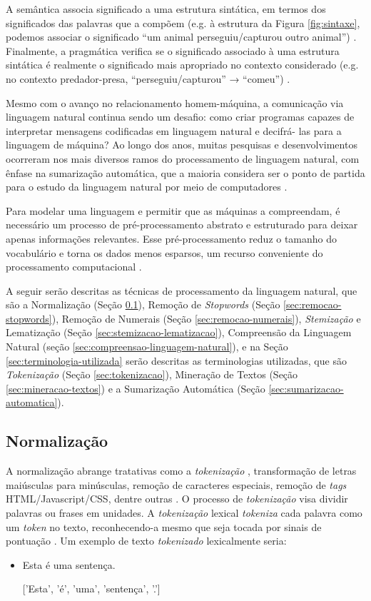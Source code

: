 A semântica associa significado a uma estrutura sintática, em termos dos significados das palavras que a compõem (e.g. à estrutura da Figura \ref{fig:sintaxe}, podemos associar o significado “um animal 
perseguiu/capturou outro animal”) \cite{de2019unidades}. Finalmente, a pragmática verifica se o significado 
associado à uma estrutura sintática é realmente o significado mais apropriado no contexto considerado (e.g. 
no contexto predador-presa, “perseguiu/capturou” → “comeu”) \cite{moro2018reconhecimento}.

Mesmo com o avanço no relacionamento homem-máquina, a comunicação via linguagem natural continua sendo um 
desafio: como criar programas capazes de interpretar mensagens codificadas em linguagem natural e decifrá-
las para a linguagem de máquina? \cite{silva2021detecccao} Ao longo dos anos, muitas pesquisas e 
desenvolvimentos ocorreram nos mais diversos ramos do processamento de linguagem natural, com ênfase na 
sumarização automática, que a maioria considera ser o ponto de partida para o estudo da linguagem natural 
por meio de computadores \cite{rodriguez2020processamento}.

Para modelar uma linguagem e permitir que as máquinas a compreendam, é necessário um processo de pré-processamento abstrato e estruturado para deixar apenas informações relevantes. Esse pré-processamento reduz o tamanho do vocabulário e torna os dados menos esparsos, um recurso conveniente do processamento computacional \cite{de2020mike}.

A seguir serão descritas as técnicas de processamento da linguagem natural, que são a Normalização (Seção \ref{sec:normalizacao}), Remoção de \textit{Stopwords} (Seção \ref{sec:remocao-stopwords}), Remoção de Numerais (Seção \ref{sec:remocao-numerais}), \textit{Stemização} e Lematização (Seção \ref{sec:stemizacao-lematizacao}), Compreensão da Linguagem Natural (seção \ref{sec:compreensao-linguagem-natural}), e na Seção \ref{sec:terminologia-utilizada} serão descritas as terminologias utilizadas, que são \textit{Tokenização} (Seção \ref{sec:tokenizacao}), Mineração de Textos (Seção \ref{sec:mineracao-textos}) e a Sumarização Automática (Seção \ref{sec:sumarizacao-automatica}).

\subsection{Normalização}
\label{sec:normalizacao}
A normalização abrange tratativas como a \textit{tokenização} \cite{de2022processamento}, transformação de letras 
maiúsculas para minúsculas, remoção de caracteres especiais, remoção de \textit{tags} HTML/Javascript/CSS, 
dentre outras \cite{motta2018estudo}. O processo de \textit{tokenização} visa dividir palavras ou frases em unidades. A \textit{tokenização} lexical \textit{tokeniza} cada palavra como um \textit{token} no texto, reconhecendo-a mesmo que seja tocada por sinais de pontuação \cite{cidrimtecnologias}. 
Um exemplo de texto \textit{tokenizado} lexicalmente seria:
\begin{itemize}
	\item Esta é uma sentença.
	\item[] ['Esta', 'é', 'uma', 'sentença', '.']
\end{itemize} 

